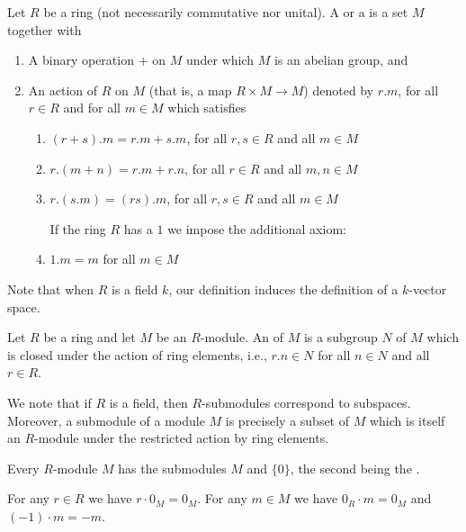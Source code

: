 \documentclass[12pt, a4paper, oneside, openright, titlepage]{book}
\begin{document}
\begin{defn}[(General)]
    Let $R$ be a ring (not necessarily commutative nor unital). A  or a  is a set $M$ together with \begin{enumerate}
        \item A binary operation $+$ on $M$ under which $M$ is an abelian group, and
        \item An action of $R$ on $M$ (that is, a map $R\times M \rightarrow M$) denoted by $r.m$, for all $r \in R$ and for all $m \in M$ which satisfies \begin{enumerate}
                \item $(r+s).m = r.m + s.m$, for all $r,s \in R$ and all $m \in M$
                \item $r.(m+n) = r.m + r.n$, for all $r \in R$ and all $m,n \in M$
                \item $r.(s.m) = (rs).m$, for all $r,s \in R$ and all $m \in M$

                    \noindent If the ring $R$ has a $1$ we impose the additional axiom:
                \item $1.m = m$ for all $m \in M$
        \end{enumerate}
    \end{enumerate}
\end{defn}

Note that when $R$ is a field $k$, our definition induces the definition of a $k$-vector space.

\begin{defn}
    Let $R$ be a ring and let $M$ be an $R$-module. An  of $M$ is a subgroup $N$ of $M$ which is closed under the action of ring elements, i.e., $r.n \in N$ for all $n \in N$ and all $r \in R$.
\end{defn}

We note that if $R$ is a field, then $R$-submodules correspond to subspaces. Moreover, a submodule of a module $M$ is precisely a subset of $M$ which is itself an $R$-module under the restricted action by ring elements.

Every $R$-module $M$ has the submodules $M$ and $\{0\}$, the second being the .

\begin{lem}
    For any $r \in R$ we have $r \cdot 0_M = 0_M$. For any $m \in M$ we have $0_R\cdot m = 0_M$ and $(-1)\cdot m = -m$.
\end{lem}
\end{document}
